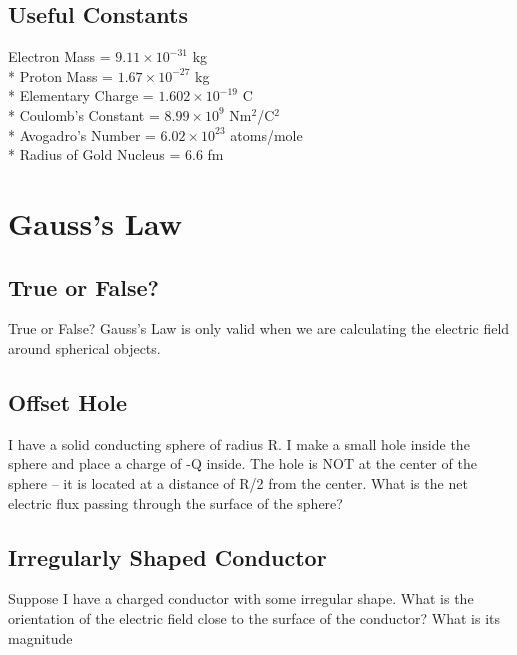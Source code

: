 \documentclass[11pt]{article}
\begin{document}
\maketitle
\tableofcontents
\vspace{10pt}

\subsection*{Useful Constants}
Electron Mass = $9.11 \times 10^{-31}$ kg \\*
Proton Mass = $1.67 \times 10^{-27}$ kg \\*
Elementary Charge = $1.602 \times 10^{-19}$ C \\*
Coulomb's Constant = $8.99 \times 10^9$ Nm$^2$/C$^2$ \\*
Avogadro's Number = $ 6.02 \times 10^{23}$ atoms/mole \\*
Radius of Gold Nucleus = 6.6 fm


\pagebreak
\section{Gauss's Law}

\subsection{True or False?}
True or False?  Gauss's Law is only valid when we are calculating the electric field around spherical objects.

\subsection{Offset Hole}
I have a solid conducting sphere of radius R.  I make a small hole inside the sphere and place a charge of -Q inside.  The hole is NOT at the center of the sphere – it is located at a distance of R/2 from the center.  What is the net electric flux passing through the surface of the sphere?

\subsection{Irregularly Shaped Conductor}
Suppose I have a charged conductor with some irregular shape.  What is the orientation of the electric field close to the surface of the conductor?  What is its magnitude
\end{document}
